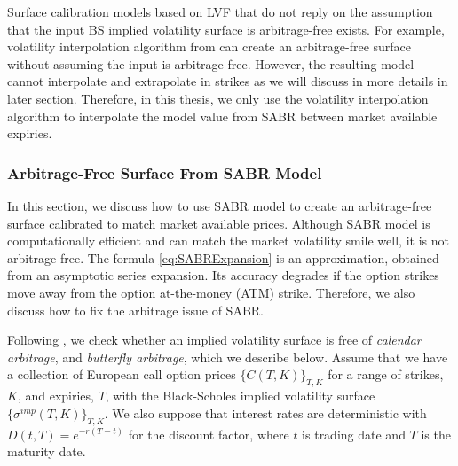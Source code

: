 \documentclass[letterpaper,12pt,titlepage,oneside,final]{book}
\numberwithin{equation}{section}
\theoremstyle{definition}
\begin{document}
Surface calibration models based on LVF that do not reply on  the assumption that the input BS implied volatility surface is arbitrage-free exists. For example, volatility interpolation algorithm from \citet{andreasen2010volatility} can create an arbitrage-free surface without assuming the  input is arbitrage-free. However, the resulting model cannot interpolate and extrapolate in strikes as we will discuss in more details in later section.  Therefore, in this thesis, we only use the volatility interpolation algorithm \cite{andreasen2010volatility} to interpolate the model value from SABR between market available expiries.


\subsubsection{Arbitrage-Free Surface From SABR Model}
In this section, we discuss how to use SABR model to create an arbitrage-free surface calibrated to match market available prices. Although SABR model is computationally efficient and can match the market volatility smile well, it is not arbitrage-free. The formula \eqref{eq:SABRExpansion} is an approximation, obtained from  an asymptotic series expansion. Its accuracy degrades if the option strikes move away from the option at-the-money (ATM) strike. Therefore, we also discuss how to fix the arbitrage issue of SABR.


Following \cite{gatheral2014arbitrage}, we  check whether  an implied volatility surface is free of \textit{calendar arbitrage}, and \textit{butterfly arbitrage}, which we describe below. Assume that we have a collection of European call option prices $\{C(T,K)\}_{T,K}$ for a range of strikes, $K$, and expiries, $T$, with the Black-Scholes implied volatility surface $\{ \sigma^{imp}(T,K)\}_{T,K}$. We also suppose that interest rates are deterministic with $D(t,T)=e^{-r(T-t)}$ for the discount factor, where $t$ is trading date and $T$ is the maturity date.
\end{document}
